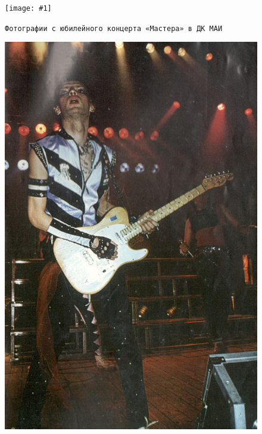 \documentclass[10pt, twoside]{book}
\newcommand{\myincludegraphics}[1]{\texttt{[image: \#1]}}
\begin{document}
\begin{figure}[h]
    \centering
    \myincludegraphics{Image37}
    \caption{\texttt{Фотографии с юбилейного концерта «Мастера» в ДК МАИ}}
\end{figure}


\begin{figure}[!ht]
    \centering
    \includegraphics[width=\paperwidth,height=\paperheight]{Cover3}
    \caption*{}
\end{figure}
\end{document}
